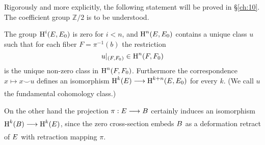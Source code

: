 \documentclass[../main]{subfiles}
\begin{document}
Rigorously and more explicitly, the following statement will be proved in \S \ref{ch:10}. The coefficient group $\mathbb{Z} / 2$ is to be understood.

\begin{theorem}\label{thm:08.01}
	The group $\operatorname{H}^{i}(E, E_{0})$ is zero for $i< n $, and $\operatorname{H}^{ n }(E, E_{0})$ contains a unique class $u$ such that for each fiber $F=\pi^{-1}(b)$ the restriction
	\[
	u|_{(F, F_{0})} \in \operatorname{H}^{ n }(F, F_{0})
	\]
	is the unique non-zero class in $\operatorname{H}^{ n }(F, F_{0})$. Furthermore the correspondence \newline $x \mapsto x \smile u$ defines an isomorphism $\homology^{k}(\total) \varrightarrow{} \homology^{k+ n }(\total, \total_{0})$ for every $k$. (We call $u$ the fundamental cohomology class.)
\end{theorem}

On the other hand the projection $\pi:\total\varrightarrow{} \B$ certainly induces an isomorphism $\homology^{k}(\B ) \varrightarrow{} \homology^{k}(\total)$, since the zero cross-section embeds $B $ as a deformation retract of $E$ with retraction mapping $\pi$.
\end{document}
